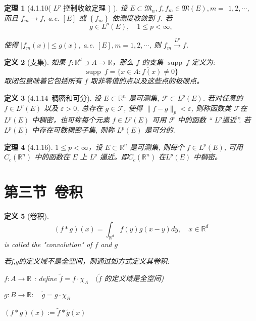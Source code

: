 \documentclass[10pt,openany]{book}
\theoremstyle{thmstyle} %
\newtheorem{theorem}{定理}[chapter]
\theoremstyle{defstyle} %
\newtheorem{definition}[theorem]{定义}
\theoremstyle{prostyle} %
\begin{document}
\begin{theorem}[4.1.10( $L^p$ 控制收敛定理 ) ]
设 $E \subset \mathfrak{M}_n, f, f_m \in \mathfrak{M}(E), m=$ $1,2, \cdots$, 而且 $f_m \rightarrow f$, a.e. $[E]$ 或 $\left\{f_m\right\}$ 依测度收敛到 $f$. 若
$$
g \in L^p(E), \quad 1 \leq p<\infty,
$$

使得 $\left|f_m(x)\right| \leq g(x)$, a.e. $[E], m=1,2, \cdots$, 则 $f_m \xrightarrow{L^p} f$.
\end{theorem}


\begin{definition}[支集]
如果 $f: \mathbb{R}^d \supset A \rightarrow \mathbb{R}$，那么 $f$ 的支集 $\operatorname{supp}~f$ 定义为:
$$
\operatorname{supp}~f=\overline{\{x \in A: f(x) \neq 0\}}
$$
取闭包意味着它包括所有 $f$ 取非零值的点以及这些点的极限点。
\end{definition}

\begin{definition}[4.1.14~稠密和可分] 
设 $E \subset \mathbb{R}^n$ 是可测集, $\mathcal{F} \subset L^p(E)$. 若对任意的 $f \in L^p(E)$ 以及 $\varepsilon>0$, 总存在 $g \in \mathcal{F}$, 使得 $\|f-g\|_p<\varepsilon$, 则称函数类 $\mathcal{F}$在 $L^p(E)$ 中稠密，也可称每个元素 $f \in L^p(E)$ 可用 $\mathcal{F}$ 中的函数 “ $L^p$逼近”. 若 $L^p(E)$ 中存在可数稠密子集, 则称 $L^p(E)$ 是可分的.
\end{definition}

\begin{theorem}[4.1.16]
$1\leq p < \infty$，设 $E \subset \mathbb{R}^n$ 是可测集, 则每个 $f \in L^p(E)$, 可用 $C_c\left(\mathbb{R}^n\right)$ 中的函数在 $E$ 上 $L^p$ 逼近。即$C_c\left(\mathbb{R}^n\right)$ 在$L^p(E)$ 中稠密。
\end{theorem}


\section{第三节~卷积}

\begin{definition}[卷积] 
$$
(f * g)(x)=\int_{\mathbb{R}^d} f(y) g(x-y) d y, \quad x \in \mathbb{R}^d
$$
is called the "convolution" of $f$ and $g$

若f,g的定义域不是全空间，则通过如方式定义其卷积:

$f: A \rightarrow \mathbb{R}$ : define $\tilde{f}=f \cdot \chi_A \quad(\tilde{f}$ 的定义域是全空间)

$g: B \rightarrow \mathbb{R}: \quad \tilde{g}=g \cdot \chi_B $

$(f * g)(x):=\tilde{f} * \tilde{g}(x)$
\end{definition}
\end{document}
